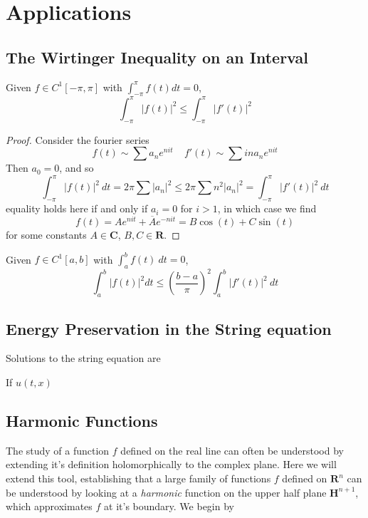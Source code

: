 \chapter{Applications}

\section{The Wirtinger Inequality on an Interval}

\begin{theorem}
    Given $f \in C^1[-\pi,\pi]$ with $\int_{-\pi}^\pi f(t) dt = 0$,
    \[ \int_{-\pi}^\pi |f(t)|^2 \leq \int_{-\pi}^\pi |f'(t)|^2 \]
\end{theorem}
\begin{proof}
    Consider the fourier series
    \[ f(t) \sim \sum a_n e^{nit}\ \ \ \ \ f'(t) \sim \sum in a_n e^{nit} \]
    Then $a_0 = 0$, and so
    \[ \int_{-\pi}^\pi |f(t)|^2\ dt = 2 \pi \sum |a_n|^2 \leq 2 \pi \sum n^2 |a_n|^2 = \int_{-\pi}^\pi |f'(t)|^2\ dt \]
    equality holds here if and only if $a_i = 0$ for $i > 1$, in which case we find
    \[ f(t) = A e^{nit} + \overline{A} e^{-nit} = B \cos(t) + C \sin(t) \]
    for some constants $A \in \mathbf{C}$, $B,C \in \mathbf{R}$.
\end{proof}

\begin{corollary}
    Given $f \in C^1[a,b]$ with $\int_a^b f(t)\ dt = 0$,
    \[ \int_a^b |f(t)|^2 dt \leq \left(\frac{b-a}{\pi}\right)^2 \int_a^b |f'(t)|^2\ dt \]
\end{corollary}

\section{Energy Preservation in the String equation}

Solutions to the string equation are

If $u(t,x)$

\section{Harmonic Functions} 

The study of a function $f$ defined on the real line can often be understood by extending it's definition holomorphically to the complex plane. Here we will extend this tool, establishing that a large family of functions $f$ defined on $\mathbf{R}^n$ can be understood by looking at a {\it harmonic} function on the upper half plane $\mathbf{H}^{n+1}$, which approximates $f$ at it's boundary. We begin by 


















